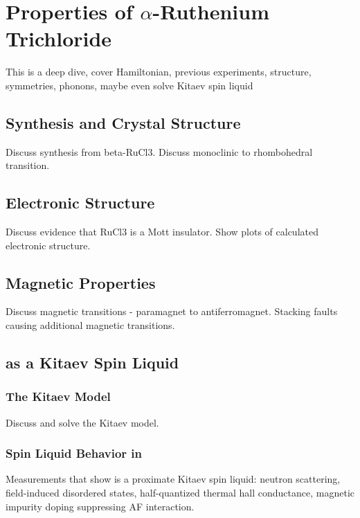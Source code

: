 \chapter{Properties of \texorpdfstring{$\alpha$-Ruthenium Trichloride}{alpha-RuCl3}}
This is a deep dive, cover Hamiltonian, previous experiments, structure, symmetries, phonons, maybe even solve Kitaev spin liquid

\section{Synthesis and Crystal Structure}

Discuss synthesis from beta-RuCl3. Discuss monoclinic to rhombohedral transition.

\section{Electronic Structure}

Discuss evidence that RuCl3 is a Mott insulator. Show plots of calculated electronic structure.

\section{Magnetic Properties}

Discuss magnetic transitions - paramagnet to antiferromagnet. Stacking faults causing additional magnetic transitions.

\section{\texorpdfstring{\rucl}{RuCl3} as a Kitaev Spin Liquid}

\subsection{The Kitaev Model}

Discuss and solve the Kitaev model.

\subsection{Spin Liquid Behavior in \texorpdfstring{\rucl}{RuCl3}}

Measurements that show \rucl is a proximate Kitaev spin liquid: neutron scattering, field-induced disordered states, half-quantized thermal hall conductance, magnetic impurity doping suppressing AF interaction.